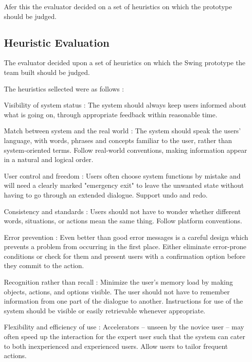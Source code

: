 \documentclass{article}
\begin{document}
Afer this the evaluator decided on a set of heuristics on which the prototype should be judged. 

\subsection{Heuristic Evaluation}

The evaluator decided upon a set of heuristics on which the Swing prototype the team built should be judged.

The heuristics sellected were as follows : 

\item Visibility of system status : The system should always keep users informed about what is going on, through appropriate feedback within reasonable time. 

\item Match between system and the real world : The system should speak the users' language, with words, phrases and concepts familiar to the user, rather than system-oriented terms. Follow real-world conventions, making information appear in a natural and logical order.
 
\item User control and freedom : Users often choose system functions by mistake and will need a clearly marked "emergency exit" to leave the unwanted state without having to go through an extended dialogue. Support undo and redo. 

\item Consistency and standards : Users should not have to wonder whether different words, situations, or actions mean the same thing. Follow platform conventions. 

\item Error prevention : Even better than good error messages is a careful design which prevents a problem from occurring in the first place. Either eliminate error-prone conditions or check for them and present users with a confirmation option before they commit to the action. 

\item Recognition rather than recall : Minimize the user's memory load by making objects, actions, and options visible. The user should not have to remember information from one part of the dialogue to another. Instructions for use of the system should be visible or easily retrievable whenever appropriate. 

\item Flexibility and efficiency of use : Accelerators -- unseen by the novice user -- may often speed up the interaction for the expert user such that the system can cater to both inexperienced and experienced users. Allow users to tailor frequent actions. 
    
\end{document}
